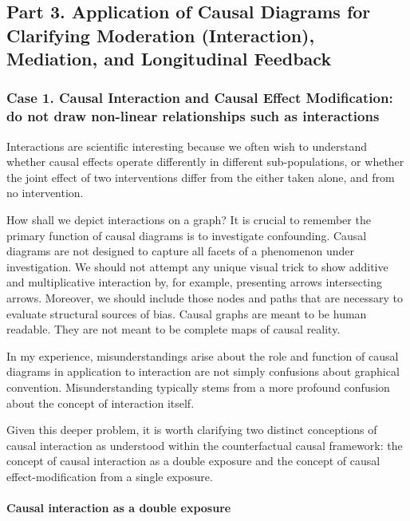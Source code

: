 \documentclass[
  singlecolumn,
  9pt]{article}
\let\oldparagraph\paragraph
\renewcommand{\paragraph}[1]{\oldparagraph{#1}\mbox{}}
\begin{document}
\subsection{Part 3. Application of Causal Diagrams for Clarifying
Moderation (Interaction), Mediation, and Longitudinal
Feedback}\label{part-3.-application-of-causal-diagrams-for-clarifying-moderation-interaction-mediation-and-longitudinal-feedback}

\subsubsection{Case 1. Causal Interaction and Causal Effect
Modification: do not draw non-linear relationships such as
interactions}\label{case-1.-causal-interaction-and-causal-effect-modification-do-not-draw-non-linear-relationships-such-as-interactions}

Interactions are scientific interesting because we often wish to
understand whether causal effects operate differently in different
sub-populations, or whether the joint effect of two interventions differ
from the either taken alone, and from no intervention.

How shall we depict interactions on a graph? It is crucial to remember
the primary function of causal diagrams is to investigate confounding.
Causal diagrams are not designed to capture all facets of a phenomenon
under investigation. We should not attempt any unique visual trick to
show additive and multiplicative interaction by, for example, presenting
arrows intersecting arrows. Moreover, we should include those nodes and
paths that are necessary to evaluate structural sources of bias. Causal
graphs are meant to be human readable. They are not meant to be complete
maps of causal reality.

In my experience, misunderstandings arise about the role and function of
causal diagrams in application to interaction are not simply confusions
about graphical convention. Misunderstanding typically stems from a more
profound confusion about the concept of interaction itself.

Given this deeper problem, it is worth clarifying two distinct
conceptions of causal interaction as understood within the
counterfactual causal framework: the concept of causal interaction as a
double exposure and the concept of causal effect-modification from a
single exposure.

\paragraph{\texorpdfstring{\textbf{Causal interaction as a double
exposure}}{Causal interaction as a double exposure}}\label{causal-interaction-as-a-double-exposure}
\end{document}
